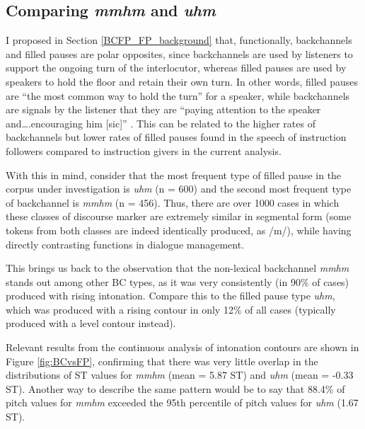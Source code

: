 \subsection{\texorpdfstring{Comparing \emph{mmhm} and \emph{uhm}}{Comparing mmhm and uhm}}\label{BCFP_Discussion_BCvsFP}


I proposed in Section \ref{BCFP_FP_background} that, functionally, backchannels and filled pauses are polar opposites, since backchannels are used by listeners to support the ongoing turn of the interlocutor, whereas filled pauses are used by speakers to hold the floor and retain their own turn. In other words, filled pauses are ``the most common way to hold the turn'' for a speaker, while backchannels are signals by the listener that they are ``paying attention to the speaker and\ldots.encouraging him {[}sic{]}'' \citep[pp. 157, 162]{wardProsodicPatternsEnglish2019}. This can be related to the higher rates of backchannels but lower rates of filled pauses found in the speech of instruction followers compared to instruction givers in the current analysis.

With this in mind, consider that the most frequent type of filled pause in the corpus under investigation is \emph{uhm} (n = 600) and the second most frequent type of backchannel is \emph{mmhm} (n = 456). Thus, there are over 1000 cases in which these classes of discourse marker are extremely similar in segmental form (some tokens from both classes are indeed identically produced, as /m/), while having directly contrasting functions in dialogue management.

This brings us back to the observation that the non-lexical backchannel \emph{mmhm} stands out among other BC types, as it was very consistently (in 90\% of cases) produced with rising intonation. Compare this to the filled pause type \emph{uhm}, which was produced with a rising contour in only 12\% of all cases (typically produced with a level contour instead).

\hspace*{-2.1pt}Relevant results from the continuous analysis of intonation contours are shown in Figure \ref{fig:BCvsFP}, confirming that there was very little overlap in the distributions of ST values for \emph{mmhm} (mean = 5.87 ST) and \emph{uhm} (mean = -0.33 ST). Another way to describe the same pattern would be to say that 88.4\% of pitch values for \emph{mmhm} exceeded the 95th percentile of pitch values for \emph{uhm} (1.67 ST).



